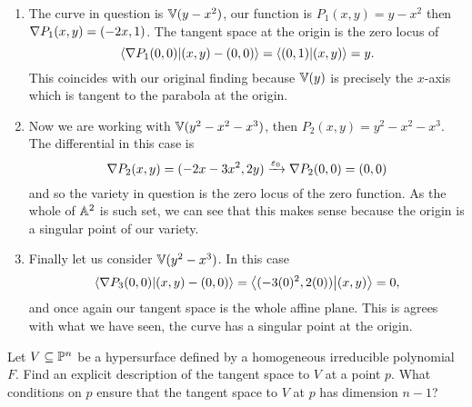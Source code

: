 \documentclass[12pt]{memoir}
\begin{document}
\begin{ptcbr}
\begin{enumerate}
	\item The curve in question is $\mathbb{V}(y-x^2)$, our function is $P_1(x,y)=y-x^2$ then $\nabla P_1(x,y)=(-2x,1)$. The tangent space at the origin is the zero locus of 
	$$\braket{\nabla P_1(0,0)}{(x,y)-(0,0)}=\braket{(0,1)}{(x,y)}=y.$$
	This coincides with our original finding because $\mathbb{V}(y)$ is precisely the $x$-axis which is tangent to the parabola at the origin.
	\item Now we are working with $\mathbb{V}(y^2-x^2-x^3)$, then $P_2(x,y)=y^2-x^2-x^3$. The differential in this case is 
	$$\nabla P_2(x,y)=(-2x-3x^2,2y)\xrightarrow{\varepsilon_0}\nabla P_2(0,0)=(0,0)$$
	and so the variety in question is the zero locus of the zero function. As the whole of $\mathbb{A}^2$ is such set, we can see that this makes sense because the origin is a singular point of our variety. 
	\item Finally let us consider $\mathbb{V}(y^2-x^3)$. In this case 
	$$\braket{\nabla P_3(0,0)}{(x,y)-(0,0)}=\braket{(-3(0)^2,2(0))}{(x,y)}=0,$$
	and once again our tangent space is the whole affine plane. This is agrees with what we have seen, the curve has a singular point at the origin.
\end{enumerate}
\end{ptcbr}
\begin{Ej}
	Let $V\subseteq\mathbb{P}^n$ be a hypersurface defined by a homogeneous
	irreducible polynomial $F$. Find an explicit description of the tangent space
	to $V$ at a point $p$. What conditions on $p$ ensure that the tangent space to
	$V$ at $p$ has dimension $n - 1$?
\end{Ej}
\end{document}
